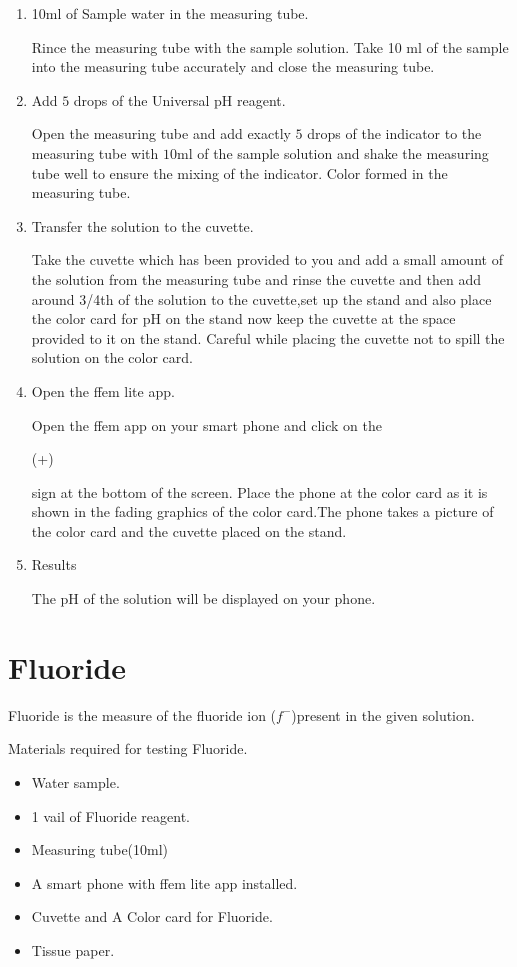 \documentclass{article}
\begin{document}
\begin{enumerate}
\item 10ml of Sample water in the measuring tube.

Rince the measuring tube with the sample solution.
Take 10 ml of the sample into the measuring tube accurately and close the measuring tube. 
\item Add $5$ drops of the Universal pH reagent.

Open the measuring tube and add exactly $5$ drops of the indicator to the measuring tube with $10$ml of the sample solution and shake the measuring tube well to ensure the mixing of the indicator. Color formed in the measuring tube.
\item Transfer the solution to the cuvette.

Take the cuvette which has been provided to you and add a small amount of the solution from the measuring tube and rinse the cuvette and then add around 3/4th of the solution to the cuvette,set up the stand and also place the color card for pH on the stand now keep the cuvette at the space provided to it on the stand. Careful while placing the cuvette not to spill the solution on the color card.
 \item Open the ffem lite app.
 
 Open the ffem app on your smart phone and click on the  \begin{large}(+)\end{large}sign at the bottom of the screen. Place the phone at the color card as it is shown in the fading graphics of the color card.The phone takes a picture of the color card and the cuvette placed on the stand.
 \item Results  
 
 The pH of the solution will be displayed on your phone.
 
\end{enumerate} 


    \section{Fluoride}
    
   Fluoride is the measure of the fluoride ion  ($f^-$)present in the given solution.
   
   Materials required for testing Fluoride.
  \begin{itemize}
  \item Water sample.
  \item 1 vail of Fluoride reagent.
  \item Measuring tube(10ml)
  \item A smart phone with ffem lite app installed.
  \item  Cuvette and A Color card for Fluoride.
  \item Tissue paper.
  \end{itemize}
  
\end{document}

